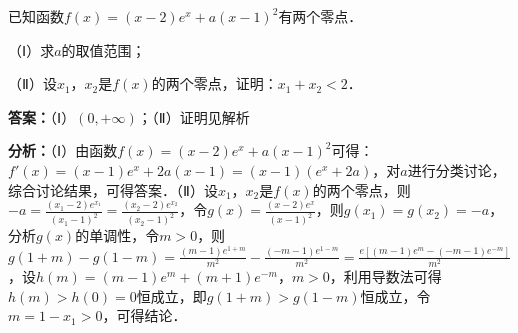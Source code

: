 \begin{question}[points=12]
已知函数$f(x)=(x-2)e^x+a(x-1)^2$有两个零点．

（Ⅰ）求$a$的取值范围；

（Ⅱ）设$x_1$，$x_2$是$f(x)$的两个零点，证明：$x_1+x_2<2$．
\begin{solution}
\textbf{答案：}（Ⅰ）$(0,+\infty)$；（Ⅱ）证明见解析

\textbf{分析：}（Ⅰ）由函数$f(x)=(x-2)e^x+a(x-1)^2$可得：$f'(x)=(x-1)e^x+2a(x-1)=(x-1)(e^x+2a)$，对$a$进行分类讨论，综合讨论结果，可得答案．（Ⅱ）设$x_1$，$x_2$是$f(x)$的两个零点，则$-a=\frac{(x_1-2)e^{x_1}}{(x_1-1)^2}=\frac{(x_2-2)e^{x_2}}{(x_2-1)^2}$，令$g(x)=\frac{(x-2)e^x}{(x-1)^2}$，则$g(x_1)=g(x_2)=-a$，分析$g(x)$的单调性，令$m>0$，则$g(1+m)-g(1-m)=\frac{(m-1)e^{1+m}}{m^2}-\frac{(-m-1)e^{1-m}}{m^2}=\frac{e[ (m-1)e^m - (-m-1)e^{-m}]}{m^2}$，设$h(m)= (m-1)e^m + (m+1)e^{-m}$，$m>0$，利用导数法可得$h(m)>h(0)=0$恒成立，即$g(1+m)>g(1-m)$恒成立，令$m=1-x_1>0$，可得结论．


\end{solution}
\end{question}
